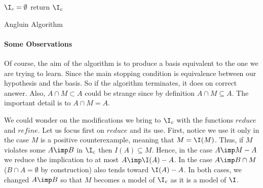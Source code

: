 \begin{algorithm}
\KwIn{$\I$}

\BlankLine
\BlankLine

$\I_c = \emptyset$ \;
return $\I_c$ \;
	
\caption{Angluin Algorithm}
\label{alg:Angluin}
\end{algorithm}

\paragraph{Some Observations} Of course, the aim of the algorithm is to produce 
a basis equivalent to the one we are trying to learn. Since the main stopping 
condition is equivalence between our hypothesis and the basis. So if the 
algorithm terminates, it does on correct answer. Also, $A \cap M \subset A$ 
could be strange since by definition $A \cap M \subseteq A$. The important 
detail is to  $A \cap M = A$.

\vspace{1.2em} 

We could wonder on the modifications we bring to $\I_c$ with the
functions $reduce$ and $refine$. Let us focus first on $reduce$ and its use.
First, notice we use it only in the case $M$ is a positive counterexample, 
meaning that $M = \I(M)$. Thus, if $M$ violates some $A \imp B$ in $\I_c$ then
$I(A) \subseteq M$. Hence, in the case $A \imp M - A$ we reduce the implication
to at most $A \imp \I(A) - A$. In the case $A \imp B \cap M$ ($B \cap A = 
\emptyset$ by construction) also tends toward $\I(A) - A$. In both cases, we 
changed $A \imp B$ so that $M$ becomes a model of $\I_c$ as it is a model of
$\I$.

\vspace{1.2em}




